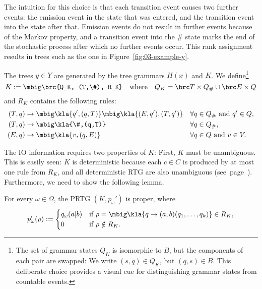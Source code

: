 The intuition for this choice is that each transition event causes two further
events: the emission event in the state that was entered, and the transition
event into the state after that. Emission events do not result in further
events because of the Markov property, and a transition event into the $\#$
state marks the end of the stochastic process after which no further events
occur. This rank assignment results in trees such as the one in
Figure~\ref{fig:03-example-y}.

The trees $y\in Y$ are generated by the tree grammars $H(x)$ and $K$. We
define\footnote{The set of grammar states $Q_K$ is isomorphic to $B$, but the
components of each pair are swapped: We write $(s,q)\in Q_K$, but $(q,s)\in B$.
This deliberate choice provides a visual cue for distinguishing grammar states
from countable events.}
\label{eq:03-K}\[
 K := \mbig\brc{Q_K, (T,\#), R_K} \quad\text{where}\quad Q_K = \brc T \times Q_\# \cup \brc E \times Q
\]
and $R_K$ contains the following rules:
\label{eq:03-R_K}\begin{align*}
 (T,q) &\to \mbig\kla{q',(q,T)}\mbig\kla{(E,q'),(T,q')} &&\forall q\in Q_\# \text{ and } q'\in Q, \\
 (T,q) &\to \mbig\kla{\#,(q,T)} &&\forall q\in Q_\#, \\
 (E,q) &\to \mbig\kla{v,(q,E)} &&\forall q\in Q \text{ and } v\in V.
\end{align*}

The IO information requires two properties of $K$: First, $K$ must be
unambiguous. This is easily seen: $K$ is deterministic because each $c\in C$ is
produced by at most one rule from $R_K$, and all deterministic RTG are also
unambiguous (see~page~\pageref{lemma:02-deterministic-is-unambiguous}). Furthermore, we need to show the following lemma.

\begin{lemma}
 For every $\omega\in\Omega$, the PRTG $(K,p_\omega')$ is proper, where
 \[
  p'_\omega(\rho) := \begin{cases}
   q_\omega(a|b) & \text{if } \rho=\mbig\kla{q\to(a,b)(q_1,\ldots,q_k)}\in R_K, \\
   0 & \text{if } \rho\notin R_K.
  \end{cases}
 \]
\end{lemma}

